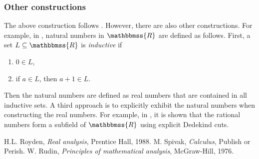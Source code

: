 \documentclass[12pt]{article}
\newcommand{\R}{\mathbbmss{R}}
\begin{document}
\subsubsection*{Other constructions}
The above construction follows \cite{royden}. However, there are also
other constructions. For example, in \cite{spivak}, natural numbers in $\R$
are defined as follows. First, a set $L\subseteq \R$ is \emph{inductiv{e}} if 
\begin{enumerate}
\item $0\in L$, 
\item if $a\in L$, then $a+1\in L$.
\end{enumerate}
Then the natural numbers are defined as real numbers that are contained in all
inductiv{e} sets.
A third approach is to explicitly exhibit the natural numbers when
constructing the real numbers. For example, in \cite{rudin}, 
it is shown that the rational numbers form a subfield of $\R$
using explicit Dedekind cuts. 


\begin{thebibliography}{9}
 H.L. Royden, 
   \emph{Real analysis}, Prentice Hall, 1988.
 M. Spivak,
   \emph{Calculus}, Publish or Perish.
 W. Rudin,
   \emph{Principles of mathematical analysis},
   McGraw-Hill, 1976.
\end{thebibliography}
\end{document}
